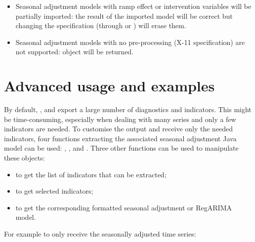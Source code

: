 \documentclass[article]{jss}
\providecommand{\tightlist}{%
  \setlength{\itemsep}{0pt}\setlength{\parskip}{0pt}}
\begin{document}
\begin{itemize}
\tightlist
\item
  Seasonal adjustment models with ramp effect or intervention variables
  will be partially imported: the result of the imported model will be
  correct but changing the specification (through  or
  ) will erase them.\\
\item
  Seasonal adjustment models with no pre-processing (X-11 specification)
  are not supported:  object will be returned.
\end{itemize}

\hypertarget{advanced-usage-and-examples}{%
\section{Advanced usage and
examples}\label{advanced-usage-and-examples}}

By default, ,  and 
export a large number of diagnostics and indicators. This might be
time-consuming, especially when dealing with many series and only a few
indicators are needed. To customise the output and receive only the
needed indicators, four functions extracting the associated seasonal
adjustment Java model can be used: , ,
 and . Three other
functions can be used to manipulate these objects:

\begin{itemize}
\tightlist
\item
   to get the list of indicators that can be
  extracted;\\
\item
   to get selected indicators;\\
\item
   to get the corresponding formatted seasonal adjustment
  or RegARIMA model.
\end{itemize}

For example to only receive the seasonally adjusted time series:
\end{document}
